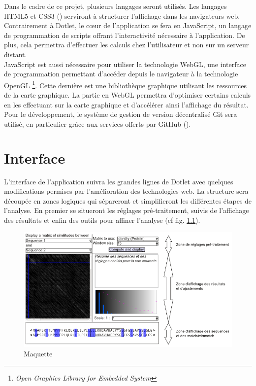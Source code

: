 \documentclass{report}
\begin{document}
Dans le cadre de ce projet, plusieurs langages seront utilisés. Les langages HTML5 et CSS3 (\cite{css3}) serviront à structurer l'affichage dans les navigateurs web.\\
Contrairement à Dotlet, le cœur de l'application se fera en JavaScript, un langage de programmation de scripts offrant l'interactivité nécessaire à l'application. De plus, cela permettra d'effectuer les calculs chez l'utilisateur et non sur un serveur distant.\\
JavaScript est aussi nécessaire pour utiliser la technologie WebGL, une interface de programmation permettant d'accéder depuis le navigateur à la technologie OpenGL \footnote{\emph{Open Graphics Library for Embedded System}}. Cette dernière est une bibliothèque graphique utilisant les ressources de la carte graphique.
La partie en WebGL permettra d'optimiser certains calculs en les effectuant sur la carte graphique et d'accélérer ainsi l'affichage du résultat.\\
Pour le développement, le système de gestion de version décentralisé Git sera utilisé, en particulier grâce aux services offerts par GitHub (\cite{github}).

\chapter{Interface}
L'interface de l'application suivra les grandes lignes de Dotlet avec quelques modifications permises par l'amélioration des technologies web. La structure sera découpée en zones logiques qui sépareront et simplifieront les différentes étapes de l'analyse. En premier se situeront les réglages pré-traitement, suivis de l'affichage des résultats et enfin des outils pour affiner l'analyse (cf fig. \ref{maquette}).\\

\begin{figure}[!ht]
\centerline{\includegraphics[scale=0.60]{maquette.png}}
\caption{Maquette}
\label{maquette}
\end{figure}
\end{document}
